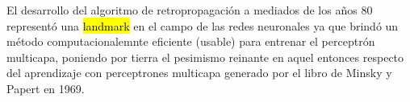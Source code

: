 \documentclass[12pt,bibliography=oldstyle,DIV=12,parskip=half-]{scrreprt}
\newcommand{\e}{\emph}
\begin{document}

{El desarrollo del algoritmo de retropropagación a mediados de los años
80 representó una \hl{landmark} en el campo de las redes neuronales ya
que brindó un método computacionalemnte eficiente (usable) para
entrenar el perceptrón multicapa, poniendo por tierra el pesimismo
reinante en aquel entonces respecto del aprendizaje con perceptrones
multicapa generado por el libro de Minsky y Papert en 1969.}



\end{document}
